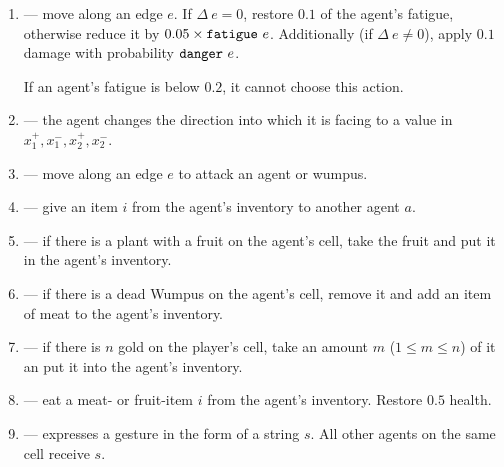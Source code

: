 \begin{definition}
\begin{description}
	\begin{enumerate}\label{lst:agentBehavior}
		\item[\action{move}] --- move along an edge $e$. If $\Delta\ e = 0$, restore $0.1$ of the agent's fatigue, otherwise reduce it by $0.05 \times \mathtt{fatigue}\ e$. Additionally (if $\Delta\ e \neq 0$), apply $0.1$ damage with probability $\field{danger}\ e$.
		
		If an agent's fatigue is below $0.2$, it cannot choose this action.
		
		\item[\action{rotate}] --- the agent changes the direction into which it is facing to a value in ${x_1^+,x_1^-,x_2^+,x_2^-}$.
		
		\item[\action{attack}] --- move along an edge $e$ to attack an agent or wumpus.
		
		\item[\action{give}] --- give an item $i$ from the agent's inventory to another agent $a$.
		
		\item[\action{gather}] --- if there is a plant with a fruit on the agent's cell, take the fruit and put it in the agent's inventory.
		
		\item[\action{butcher}] --- if there is a dead Wumpus on the agent's cell, remove it and add an item of meat to the agent's inventory.
		
		\item[\action{collect}] --- if there is $n$ gold on the player's cell, take an amount $m$ ($1 \leq m \leq n$) of it an put it into the agent's inventory.
		
		\item[\action{eat}] --- eat a meat- or fruit-item $i$ from the agent's inventory. Restore $0.5$ health.
		
		\item[\action{gesture}] --- expresses a gesture in the form of a string $s$. All other agents on the same cell receive $s$.
	\end{enumerate}
	
\end{description}
\end{definition}

